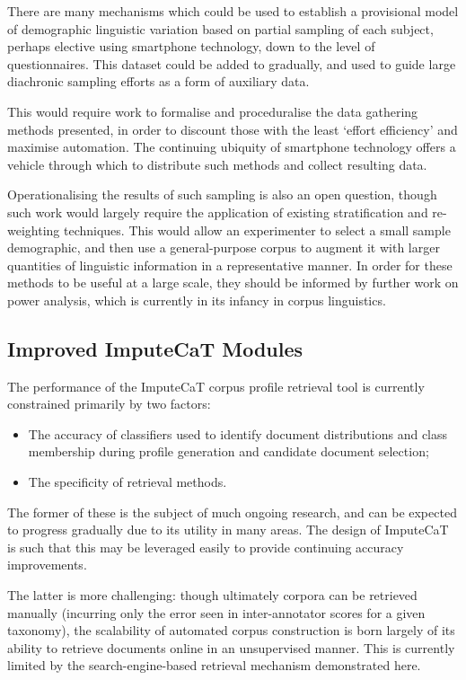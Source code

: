 There are many mechanisms which could be used to establish a provisional model of demographic linguistic variation based on partial sampling of each subject, perhaps elective using smartphone technology, down to the level of questionnaires.  This dataset could be added to gradually, and used to guide large diachronic sampling efforts as a form of auxiliary data.

This would require work to formalise and proceduralise the data gathering methods presented, in order to discount those with the least `effort efficiency' and maximise automation.  The continuing ubiquity of smartphone technology offers a vehicle through which to distribute such methods and collect resulting data.

Operationalising the results of such sampling is also an open question, though such work would largely require the application of existing stratification and re-weighting techniques.  This would allow an experimenter to select a small sample demographic, and then use a general-purpose corpus to augment it with larger quantities of linguistic information in a representative manner.  In order for these methods to be useful at a large scale, they should be informed by further work on power analysis, which is currently in its infancy in corpus linguistics.



\subsection{Improved ImputeCaT Modules}
The performance of the ImputeCaT corpus profile retrieval tool is currently constrained primarily by two factors:

\begin{itemize}
    \item The accuracy of classifiers used to identify document distributions and class membership during profile generation and candidate document selection;
    \item The specificity of retrieval methods.
\end{itemize}

The former of these is the subject of much ongoing research, and can be expected to progress gradually due to its utility in many areas.  The design of ImputeCaT is such that this may be leveraged easily to provide continuing accuracy improvements.

The latter is more challenging: though ultimately corpora can be retrieved manually (incurring only the error seen in inter-annotator scores for a given taxonomy\cite{sharoffs2015}), the scalability of automated corpus construction is born largely of its ability to retrieve documents online in an unsupervised manner.  This is currently limited by the search-engine-based retrieval mechanism demonstrated here.

